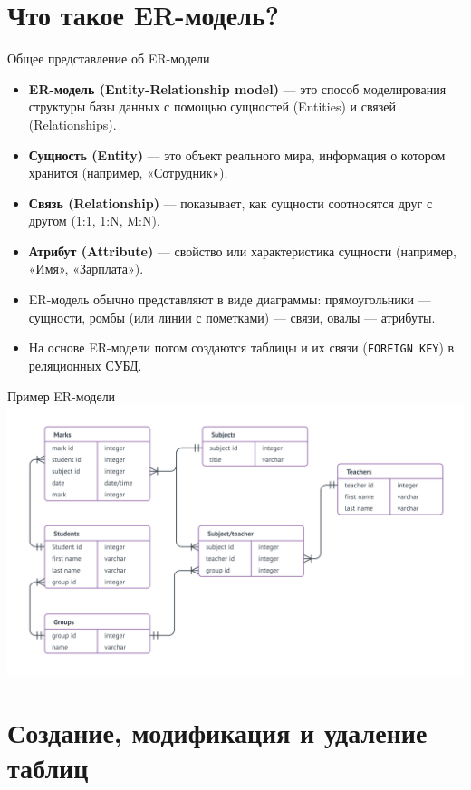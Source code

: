 \documentclass{beamer}
\begin{document}
\section{Что такое ER-модель?}
\begin{frame}{Общее представление об ER-модели}
	\begin{itemize}
		\item \textbf{ER-модель (Entity-Relationship model)} — это способ моделирования структуры базы данных
		      с помощью сущностей (Entities) и связей (Relationships).
		\item \textbf{Сущность (Entity)} — это объект реального мира, информация о котором хранится (например, «Сотрудник»).
		\item \textbf{Связь (Relationship)} — показывает, как сущности соотносятся друг с другом (1:1, 1:N, M:N).
		\item \textbf{Атрибут (Attribute)} — свойство или характеристика сущности (например, «Имя», «Зарплата»).
		\item ER-модель обычно представляют в виде диаграммы: прямоугольники — сущности,
		      ромбы (или линии с пометками) — связи, овалы — атрибуты.
		\item На основе ER-модели потом создаются таблицы и их связи (\texttt{FOREIGN KEY}) в реляционных СУБД.
	\end{itemize}
\end{frame}


\begin{frame}{Пример ER-модели}
	\includegraphics[scale=0.3]{er.png}
\end{frame}

\section{Создание, модификация и удаление таблиц}
\end{document}
